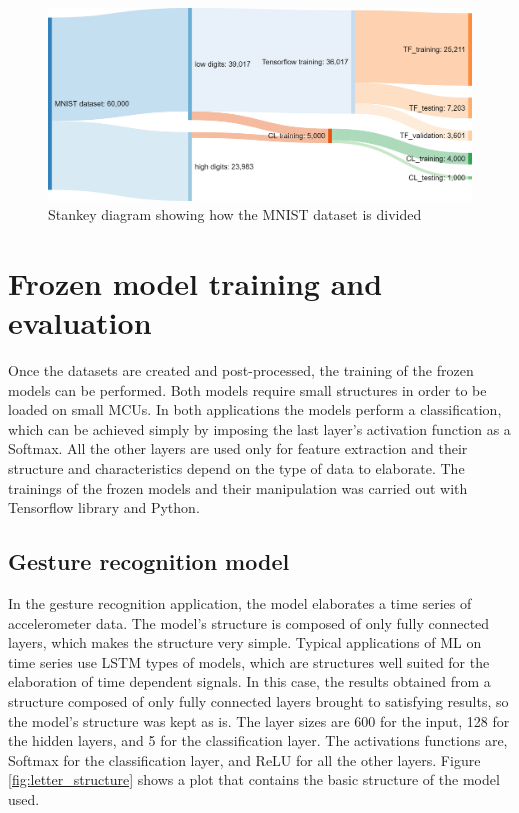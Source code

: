\documentclass[12pt]{report}
\begin{document}
\begin{figure}[h!]
    \centering
    \includegraphics[width=120mm]{Figures/Chapter4/flow_dataset_openmv.png} 
    \caption{Stankey diagram showing how the MNIST dataset is divided}
    \label{fig:flow_dataset_openmv}    
\end{figure}

\section{Frozen model training and evaluation}
Once the datasets are created and post-processed, the training of the frozen models can be performed. Both models require small structures in order to be loaded on small MCUs. In both applications the models perform a classification, which can be achieved simply by imposing the last layer's activation function as a Softmax. All the other layers are used only for feature extraction and their structure and characteristics depend on the type of data to elaborate.
The trainings of the frozen models and their manipulation was carried out with Tensorflow library and Python.\\

\subsection{Gesture recognition model}
In the gesture recognition application, the model elaborates a time series of accelerometer data. The model's structure is composed of only fully connected layers, which makes the structure very simple. Typical applications of ML on time series use LSTM types of models, which are structures well suited for the elaboration of time dependent signals. In this case, the results obtained from a structure composed of only fully connected layers brought to satisfying results, so the model's structure was kept as is. The layer sizes are 600 for the input, 128 for the hidden layers, and 5 for the classification layer. The activations functions are, Softmax for the classification layer, and ReLU for all the other layers. Figure \ref{fig:letter_structure} shows a plot that contains the basic structure of the model used.\\
\end{document}

